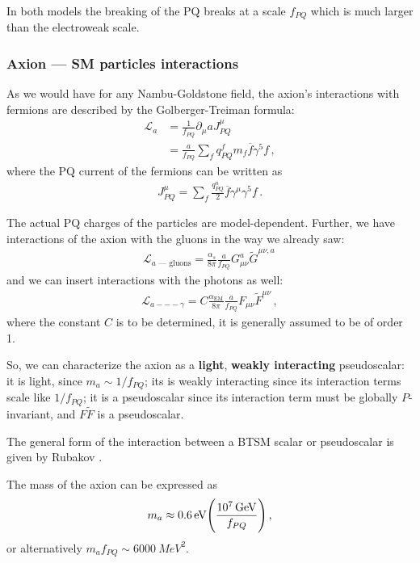\documentclass[main.tex]{subfiles}
\begin{document}
In both models the breaking of the PQ breaks at a scale \(f_{PQ}\) which is much larger than the electroweak scale.

\subsubsection{Axion --- SM particles interactions}

As we would have for any Nambu-Goldstone field, the axion's interactions with fermions are described by the Golberger-Treiman formula: 
%
\begin{align}
\mathscr{L}_{a} &= \frac{1}{f_{PQ}} \partial_{\mu }a J^{\mu }_{PQ}  \\
&= \frac{a}{f_{PQ}} \sum_{f} q^{f}_{PQ} m_f \overline{f}\gamma^{5} f
\,,
\end{align}
%
where the PQ current of the fermions can be written as 
%
\begin{align}
J^{\mu }_{PQ} = \sum _{f} \frac{q^{n}_{PQ}}{2} \overline{f} \gamma^{\mu } \gamma^{5} f
\,.
\end{align}

The actual PQ charges of the particles are model-dependent. 
Further, we have interactions of the axion with the gluons in the way we already saw: 
%
\begin{align}
\mathscr{L}_{a \text{ --- gluons}} = \frac{\alpha_{s}}{8 \pi } \frac{a}{f_{PQ}} G_{\mu \nu }^{a} \widetilde{G}^{\mu \nu , a}
\,
\end{align}
%
and we can insert interactions with the photons as well: 
%
\begin{align}
\mathscr{L}_{a --- \gamma } = C \frac{\alpha _{\text{EM}}}{8 \pi } \frac{a}{f_{PQ}} F_{\mu \nu } \widetilde{F}^{\mu \nu }
\,,
\end{align}
%
where the constant \(C\) is to be determined, it is generally assumed to be of order 1. 

So, we can characterize the axion as a \textbf{light}, \textbf{weakly interacting} pseudoscalar:
it is light, since \(m_a \sim 1 / f_{PQ}\); its is weakly interacting since its interaction terms scale like \(1 / f_{PQ}\); it is a pseudoscalar since its interaction term must be globally \(P\)-invariant, and \(F \widetilde{F}\) is a pseudoscalar. 

The general form of the interaction between a BTSM scalar or pseudoscalar is given by Rubakov \cite[eq.\ 9.79]{gorbunovIntroductionTheoryEarly2011}.

The mass of the axion can be expressed as 
%
\begin{align}
m_a \approx \SI{.6}{eV} \qty(\frac{\SI{e7}{GeV}}{f_{PQ}})
\,,
\end{align}
%
or alternatively \(m_a f_{PQ} \sim \SI{6000}{MeV^2}\). 
\end{document}
